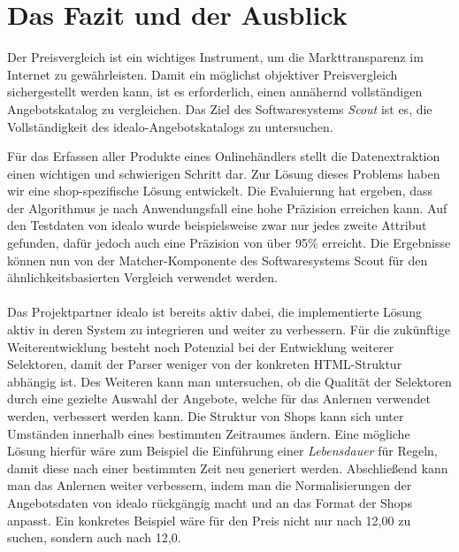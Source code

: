 \section{Das Fazit und der Ausblick}
\label{sec:abschluss}

Der Preisvergleich ist ein wichtiges Instrument, um die Markttransparenz im Internet zu gewährleisten.
Damit ein möglichst objektiver Preisvergleich sichergestellt werden kann, ist es erforderlich, einen annähernd
vollständigen Angebotskatalog zu vergleichen.
Das Ziel des Softwaresystems \textit{Scout} ist es, die Vollständigkeit des idealo-Angebotskatalogs zu untersuchen.

Für das Erfassen aller Produkte eines Onlinehändlers stellt die Datenextraktion einen wichtigen und schwierigen
Schritt dar.
Zur Lösung dieses Problems haben wir eine shop-spezifische Lösung entwickelt.
Die Evaluierung hat ergeben, dass der Algorithmus je nach Anwendungsfall eine hohe Präzision erreichen kann.
Auf den Testdaten von idealo wurde beispielsweise zwar nur jedes zweite Attribut gefunden, dafür jedoch auch eine
Präzision von über 95\% erreicht.
Die Ergebnisse können nun von der Matcher-Komponente des Softwaresystems Scout für den ähnlichkeitsbasierten
Vergleich verwendet werden.
\\
~\\
Das Projektpartner idealo ist bereits aktiv dabei, die implementierte Lösung aktiv in deren System zu
integrieren und weiter zu verbessern.
Für die zukünftige Weiterentwicklung besteht noch Potenzial bei der Entwicklung weiterer Selektoren, damit der Parser
weniger von der konkreten HTML-Struktur abhängig ist.
Des Weiteren kann man untersuchen, ob die Qualität der Selektoren durch eine gezielte Auswahl der Angebote, welche
für das Anlernen verwendet werden, verbessert werden kann.
Die Struktur von Shops kann sich unter Umständen innerhalb eines bestimmten Zeitraumes ändern.
Eine mögliche Lösung hierfür wäre zum Beispiel die Einführung einer \textit{Lebensdauer} für Regeln, damit diese nach
einer bestimmten Zeit neu generiert werden.
Abschließend kann man das Anlernen weiter verbessern, indem man die Normalisierungen der Angebotsdaten von idealo
rückgängig macht und an das Format der Shops anpasst.
Ein konkretes Beispiel wäre für den Preis nicht nur nach 12,00 zu suchen, sondern auch nach 12,0.